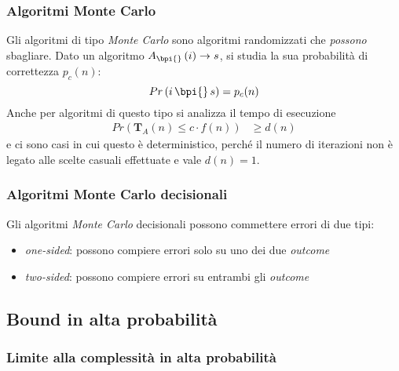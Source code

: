 \subsubsection{Algoritmi Monte Carlo}
Gli algoritmi di tipo \emph{Monte Carlo} sono algoritmi randomizzati che \emph{possono} sbagliare.
Dato un algoritmo $
A_{\bpi{}} \left( i \right) \to s
$, si studia la sua probabilità di correttezza $
p_c(n)
$:
\begin{equation*}
    Pr \left( 
        i
        \,
        \bpi{}
        \,
        s
    \right)
    = p_c(n)
\end{equation*}
Anche per algoritmi di questo tipo si analizza il tempo di esecuzione
\begin{align*}
    Pr \left( 
        \bm{T}_A \left( 
            n
        \right)
        \leq c \cdot f(n)
    \right)
    &
    \geq d(n)
\end{align*}
e ci sono casi in cui questo è deterministico, perché il numero di iterazioni non è legato alle scelte casuali effettuate e vale $
d(n) = 1
$.

\subsubsection{Algoritmi Monte Carlo decisionali}
Gli algoritmi \emph{Monte Carlo} decisionali possono commettere errori di due tipi:
\begin{itemize}
    \item \emph{one-sided}: possono compiere errori solo su uno dei due \emph{outcome}
    \item \emph{two-sided}: possono compiere errori su entrambi gli \emph{outcome}
\end{itemize}

\subsection{Bound in alta probabilità}

\subsubsection{Limite alla complessità in alta probabilità}


